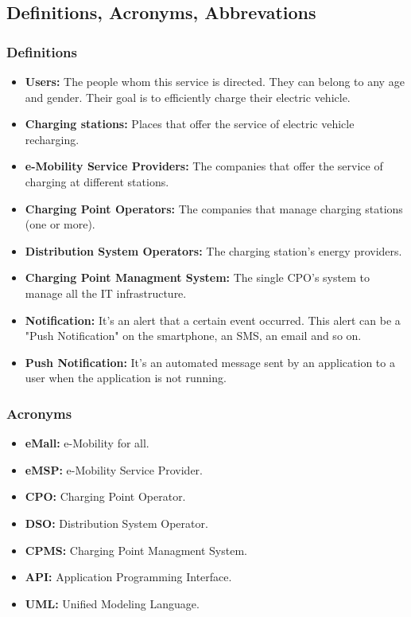 \subsection{Definitions, Acronyms, Abbrevations}
\subsubsection{Definitions}
\begin{itemize}
        \item \textbf{Users:} The people whom this service is directed. 
        They can belong to any age and gender. 
        Their goal is to efficiently charge their electric vehicle.
        \item \textbf{Charging stations:} Places that offer the service of electric vehicle recharging.
        \item \textbf{e-Mobility Service Providers:} The companies that offer the service of charging at different stations.
        \item \textbf{Charging Point Operators:} The companies that manage charging stations (one or more).
        \item \textbf{Distribution System Operators:} The charging station's energy providers.
        \item \textbf{Charging Point Managment System:} The single CPO's system to manage all the IT infrastructure.
        \item \textbf{Notification:} It's an alert that a certain event occurred. 
        This alert can be a "Push Notification" on the smartphone, an SMS, an email and so on.
        \item \textbf{Push Notification:} It's an automated message sent by an application to a user when the application is not running.
\end{itemize}
\subsubsection{Acronyms}
\begin{itemize}
        \item \textbf{eMall:} e-Mobility for all.
        \item \textbf{eMSP:} e-Mobility Service Provider.
        \item \textbf{CPO:} Charging Point Operator.
        \item \textbf{DSO:} Distribution System Operator.
        \item \textbf{CPMS:} Charging Point Managment System.
        \item \textbf{API:} Application Programming Interface.
        \item \textbf{UML:} Unified Modeling Language.
\end{itemize}
